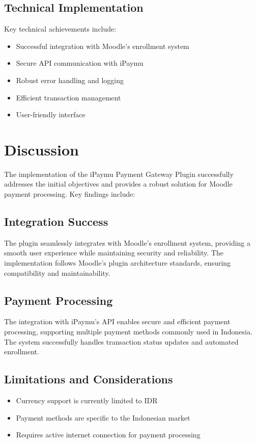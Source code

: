 \documentclass{article} %
\begin{document}
    \subsection{Technical Implementation}
    Key technical achievements include:
    \begin{itemize}
        \item Successful integration with Moodle's enrollment system
        \item Secure API communication with iPaymu
        \item Robust error handling and logging
        \item Efficient transaction management
        \item User-friendly interface
    \end{itemize}


\section{Discussion}
    The implementation of the iPaymu Payment Gateway Plugin successfully addresses the initial objectives and provides a robust solution for Moodle payment processing. Key findings include:

    \subsection{Integration Success}
    The plugin seamlessly integrates with Moodle's enrollment system, providing a smooth user experience while maintaining security and reliability. The implementation follows Moodle's plugin architecture standards, ensuring compatibility and maintainability.

    \subsection{Payment Processing}
    The integration with iPaymu's API enables secure and efficient payment processing, supporting multiple payment methods commonly used in Indonesia. The system successfully handles transaction status updates and automated enrollment.

    \subsection{Limitations and Considerations}
    \begin{itemize}
        \item Currency support is currently limited to IDR
        \item Payment methods are specific to the Indonesian market
        \item Requires active internet connection for payment processing
    \end{itemize}
\end{document}
